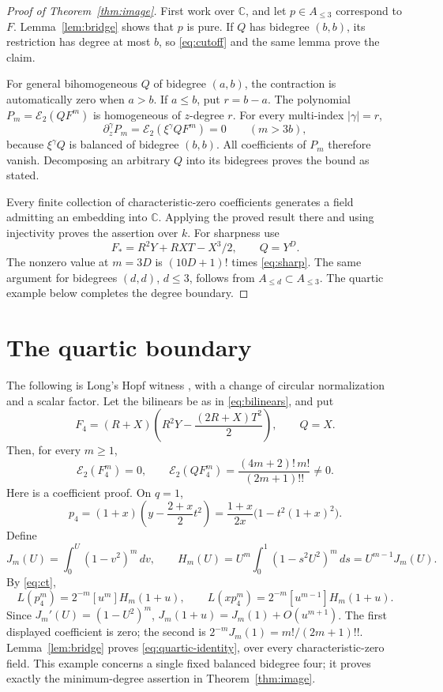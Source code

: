 \documentclass[11pt]{article}
\newcommand{\C}{\mathbb C}
\newcommand{\E}{\mathcal E_2}
\newcommand{\dd}{\,d}
\theoremstyle{remark}\newtheorem{remark}[theorem]{Remark}
\begin{document}
\begin{proof}[Proof of Theorem~\ref{thm:image}]
First work over \(\C\), and let \(p\in A_{\leq3}\) correspond to
\(F\). Lemma~\ref{lem:bridge} shows that \(p\) is pure.
If \(Q\) has bidegree \((b,b)\), its restriction has degree at most
\(b\), so \eqref{eq:cutoff} and the same lemma prove the claim.

For general bihomogeneous \(Q\) of bidegree \((a,b)\), the contraction
is automatically zero when \(a>b\). If \(a\leq b\), put
\(r=b-a\). The polynomial \(P_m=\E(QF^m)\) is homogeneous of
\(z\)-degree \(r\). For every multi-index \(|\gamma|=r\),
\[
 \partial_z^\gamma P_m=\E(\xi^\gamma QF^m)=0\qquad(m>3b),
\]
because \(\xi^\gamma Q\) is balanced of bidegree \((b,b)\).
All coefficients of \(P_m\) therefore vanish. Decomposing an arbitrary
\(Q\) into its bidegrees proves the bound as stated.

Every finite collection of characteristic-zero coefficients generates
a field admitting an embedding into \(\C\). Applying the proved result
there and using injectivity proves the assertion over \(k\).
For sharpness use
\[
 F_*=R^2Y+RXT-X^3/2,\qquad Q=Y^D.
\]
The nonzero value at \(m=3D\) is \((10D+1)!\) times
\eqref{eq:sharp}. The same argument for bidegrees \((d,d)\),
\(d\leq3\), follows from \(A_{\leq d}\subset A_{\leq3}\).
The quartic example below completes the degree boundary.
\end{proof}

\section{The quartic boundary}\label{sec:quartic}

The following is Long's Hopf witness \cite[Theorem~3.1]{LongHopf26}, with a change of circular normalization and a scalar factor. Let the bilinears be as in \eqref{eq:bilinears}, and put
\begin{equation}\label{eq:quartic}
 F_4=(R+X)\left(R^2Y-\frac{(2R+X)T^2}{2}\right),\qquad Q=X.
\end{equation}
Then, for every \(m\geq1\),
\begin{equation}\label{eq:quartic-identity}
 \E(F_4^m)=0,\qquad
 \E(QF_4^m)=\frac{(4m+2)!\,m!}{(2m+1)!!}\ne0.
\end{equation}
Here is a coefficient proof. On \(q=1\),
\[
 p_4=(1+x)\left(y-\frac{2+x}{2}t^2\right)
     =\frac{1+x}{2x}\bigl(1-t^2(1+x)^2\bigr).
\]
Define
\[
 J_m(U)=\int_0^U(1-v^2)^m\dd v,\qquad
 H_m(U)=U^m\int_0^1(1-s^2U^2)^m\dd s=U^{m-1}J_m(U).
\]
By \eqref{eq:ct},
\[
 L(p_4^m)=2^{-m}[u^m]H_m(1+u),\qquad
 L(xp_4^m)=2^{-m}[u^{m-1}]H_m(1+u).
\]
Since \(J_m'(U)=(1-U^2)^m\),
\(J_m(1+u)=J_m(1)+O(u^{m+1})\).
The first displayed coefficient is zero; the second is
\(2^{-m}J_m(1)=m!/(2m+1)!!\). Lemma~\ref{lem:bridge} proves
\eqref{eq:quartic-identity}, over every characteristic-zero field.
This example concerns a single fixed balanced bidegree four; it proves
exactly the minimum-degree assertion in Theorem~\ref{thm:image}.
\end{document}
